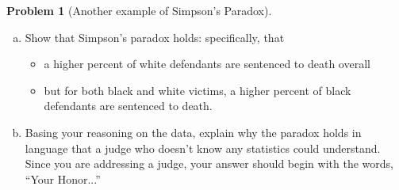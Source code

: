 \documentclass[10pt]{amsart}
\theoremstyle{definition}
\newtheorem{problem}[theorem]{Problem}
\newcommand{\1}[1]{\textbf{1}_{\left[#1\right]}} %
\begin{document}
\begin{problem}[Another example of Simpson's Paradox]
\begin{enumerate}[(a)]
    result?
    \item Show that Simpson's paradox holds: specifically, that
    \begin{itemize}
      \item a higher percent of white defendants are sentenced to death
      overall
      \item but for both black and white victims, a higher percent of black
      defendants are sentenced to death.
    \end{itemize}
    \item Basing your reasoning on the data, explain why the paradox holds in
    language that a judge who doesn't know any statistics could understand.
    Since you are addressing a judge, your answer should begin with the words,
    ``Your Honor...''
  \end{enumerate}


 
\end{problem}


  

\end{document}
